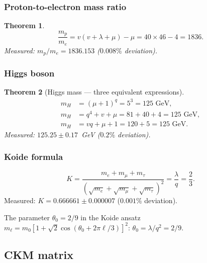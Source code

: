 \documentclass[12pt,a4paper]{article}
\newtheorem{theorem}{Theorem}[section]
\theoremstyle{definition}
\begin{document}
\subsubsection*{Proton-to-electron mass ratio}

\begin{theorem}
\begin{equation}
  \boxed{\frac{m_p}{m_e} = v(v+\lambda+\mu)-\mu = 40\times 46-4 = 1836.}
\end{equation}
Measured: $m_p/m_e=1836.153$ ($0.008\%$ deviation).
\end{theorem}

\subsubsection*{Higgs boson}

\begin{theorem}[Higgs mass --- three equivalent expressions]
\begin{align}
  m_H &= (\mu+1)^q = 5^3 = 125\text{ GeV}, \\
  m_H &= q^4+v+\mu = 81+40+4 = 125\text{ GeV}, \\
  m_H &= vq+\mu+1 = 120+5 = 125\text{ GeV}.
\end{align}
Measured: $125.25\pm 0.17$~GeV ($0.2\%$ deviation).
\end{theorem}

\subsubsection*{Koide formula}

\begin{equation}
  K = \frac{m_e+m_\mu+m_\tau}{(\sqrt{m_e}+\sqrt{m_\mu}+\sqrt{m_\tau})^2}
    = \frac{\lambda}{q} = \frac{2}{3}.
\end{equation}
Measured: $K=0.666661\pm 0.000007$ ($0.001\%$ deviation).

The parameter $\theta_0=2/9$ in the Koide ansatz
$m_\ell = m_0[1+\sqrt{2}\cos(\theta_0+2\pi\ell/3)]^2$:
$\theta_0 = \lambda/q^2 = 2/9$.

\subsection{CKM matrix}
\end{document}
